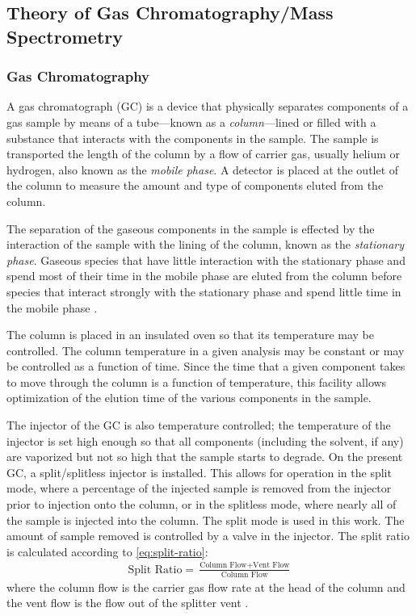 \documentclass[../main.tex]{subfiles}
\begin{document}
\subsection{Theory of Gas Chromatography/Mass Spectrometry}
\label{sec:gcms-theory}

\subsubsection{Gas Chromatography}

A gas chromatograph (GC) is a device that physically separates components
of a gas sample by means of a tube---known as a \textit{column}---lined or filled
with a substance that interacts with the components in the sample. The sample
is transported the length of the column by a flow of carrier gas, usually
helium or hydrogen, also known as the \textit{mobile phase}. A detector is
placed at the outlet of the column to measure the amount and type
of components eluted from the column.

The separation of the gaseous components in the sample is effected by
the interaction of the sample with the lining of the column, known as the
\textit{stationary phase}. Gaseous species that have little interaction with
the stationary phase and spend most of their time in the mobile phase
are eluted from the column before species that interact strongly with
the stationary phase and spend little time in the mobile phase \cite{Sparkman2011a}.

The column is placed in an insulated oven so that its temperature may be
controlled. The column temperature in a given analysis may be constant
or may be controlled as a function of time. Since the time that a given
component takes to move through the column is a function of temperature,
this facility allows optimization of the elution time of the various
components in the sample.

The injector of the GC is also temperature controlled; the temperature of
the injector is set high enough so that all components (including the solvent,
if any) are vaporized but not so high that the sample starts to degrade. On the present GC,
a split/splitless injector is installed. This allows for operation in the
split mode, where a percentage of the injected sample is removed from the
injector prior to injection onto the column, or in the splitless mode,
where nearly all of the sample is injected into the column. The split mode
is used in this work. The amount of sample removed is controlled by a valve
in the injector. The split ratio is calculated according to \cref{eq:split-ratio}:
%
\begin{gather}
\label{eq:split-ratio}
\text{Split Ratio} = \frac{\text{Column Flow} +\text{Vent Flow}}{\text{Column Flow}}
\end{gather}
%
where the column flow is the carrier gas flow rate at the head of the column
and the vent flow is the flow out of the splitter vent \cite{Sparkman2011a}.
\end{document}
